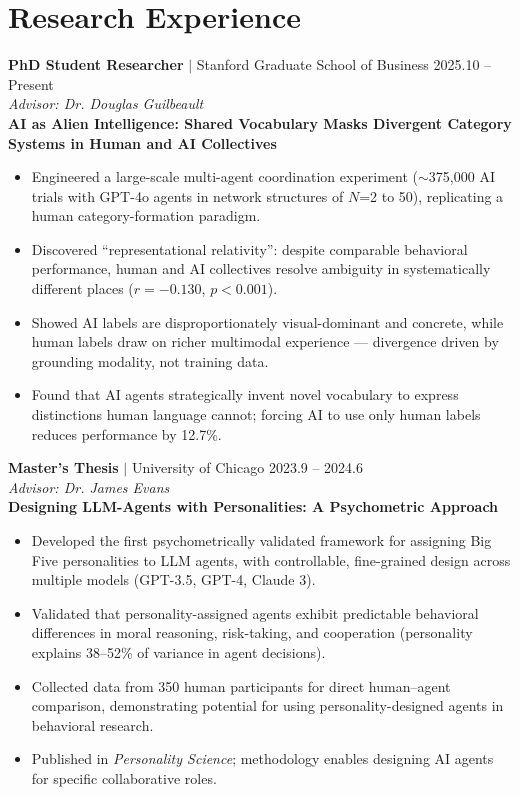 \documentclass[11pt,letterpaper]{article}
\newcommand{\project}[1]{\textbf{\textcolor{black!80}{#1}}}
\newcommand{\advisor}[1]{\textit{Advisor: #1}}
\begin{document}
\section*{Research Experience}

\noindent\textbf{PhD Student Researcher} $|$ Stanford Graduate School of Business \hfill 2025.10 -- Present\\
\noindent\advisor{Dr. Douglas Guilbeault}\\[0.3em]
\noindent\project{AI as Alien Intelligence: Shared Vocabulary Masks Divergent Category Systems in Human and AI Collectives}
\begin{itemize}
    \item Engineered a large-scale multi-agent coordination experiment ($\sim$375,000 AI trials with GPT-4o agents in network structures of $N$=2 to 50), replicating a human category-formation paradigm.
    \item Discovered ``representational relativity'': despite comparable behavioral performance, human and AI collectives resolve ambiguity in systematically different places ($r = -0.130$, $p < 0.001$).
    \item Showed AI labels are disproportionately visual-dominant and concrete, while human labels draw on richer multimodal experience --- divergence driven by grounding modality, not training data.
    \item Found that AI agents strategically invent novel vocabulary to express distinctions human language cannot; forcing AI to use only human labels reduces performance by 12.7\%.
\end{itemize}

\vspace{0.5em}

\noindent\textbf{Master's Thesis} $|$ University of Chicago \hfill 2023.9 -- 2024.6\\
\noindent\advisor{Dr. James Evans}\\[0.3em]
\noindent\project{Designing LLM-Agents with Personalities: A Psychometric Approach}
\begin{itemize}
    \item Developed the first psychometrically validated framework for assigning Big Five personalities to LLM agents, with controllable, fine-grained design across multiple models (GPT-3.5, GPT-4, Claude 3).
    \item Validated that personality-assigned agents exhibit predictable behavioral differences in moral reasoning, risk-taking, and cooperation (personality explains 38--52\% of variance in agent decisions).
    \item Collected data from 350 human participants for direct human--agent comparison, demonstrating potential for using personality-designed agents in behavioral research.
    \item Published in \textit{Personality Science}; methodology enables designing AI agents for specific collaborative roles.
\end{itemize}
\end{document}
